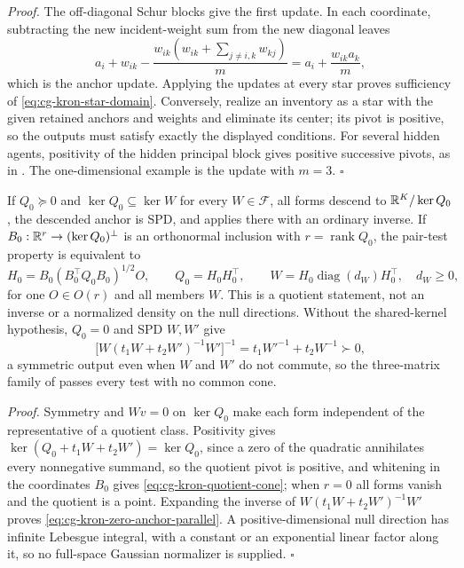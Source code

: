 \noindent\emph{Proof.}
The off-diagonal Schur blocks give the first update. In each coordinate,
subtracting the new incident-weight sum from the new diagonal leaves
\begin{equation}
a_i+w_{ik}
-\frac{w_{ik}(w_{ik}+\sum_{j\neq i,k}w_{kj})}{m}
=a_i+\frac{w_{ik}a_k}{m},
\label{eq:cg-kron-scalar-anchor-remainder}
\end{equation}
which is the anchor update. Applying the updates at every star proves
sufficiency of \eqref{eq:cg-kron-star-domain}. Conversely, realize an inventory
as a star with the given retained anchors and weights and eliminate its center;
its pivot is positive, so the outputs must satisfy exactly the displayed
conditions. For several hidden agents, positivity of the hidden principal block
gives positive successive pivots, as in .
The one-dimensional example is the update with \(m=3\). \(\square\)

If \(Q_0\succeq0\) and \(\ker Q_0\subseteq\ker W\) for every
\(W\in\mathscr F\), all forms descend to \(\mathbb R^K/\ker Q_0\), the descended anchor
is SPD, and  applies there with an
ordinary inverse. If \(B_0:\mathbb R^{r}\to(\ker Q_0)^\perp\) is an orthonormal
inclusion with \(r=\operatorname{rank}Q_0\), the pair-test property is
equivalent to
\begin{equation}
H_0=B_0(B_0^\top Q_0B_0)^{1/2}O,\qquad
Q_0=H_0H_0^\top,\qquad
W=H_0\operatorname{diag}(d_W)H_0^\top,\quad d_W\geq0,
\label{eq:cg-kron-quotient-cone}
\end{equation}
for one \(O\in O(r)\) and all members \(W\). This is a quotient statement, not
an inverse or a normalized density on the null directions. Without the
shared-kernel hypothesis, \(Q_0=0\) and SPD \(W,W'\) give
\begin{equation}
\bigl[W(t_1W+t_2W')^{-1}W'\bigr]^{-1}=t_1W'^{-1}+t_2W^{-1}\succ0,
\label{eq:cg-kron-zero-anchor-parallel}
\end{equation}
a symmetric output even when \(W\) and \(W'\) do not commute, so the
three-matrix family of  passes
every test with no common cone. 

\noindent\emph{Proof.}
Symmetry and \(Wv=0\) on \(\ker Q_0\) make each form independent of the
representative of a quotient class. Positivity gives
\(\ker(Q_0+t_1W+t_2W')=\ker Q_0\), since a zero of the quadratic annihilates
every nonnegative summand, so the quotient pivot is positive, and whitening in
the coordinates \(B_0\) gives \eqref{eq:cg-kron-quotient-cone}; when \(r=0\) all
forms vanish and the quotient is a point. Expanding the inverse of
\(W(t_1W+t_2W')^{-1}W'\) proves \eqref{eq:cg-kron-zero-anchor-parallel}. A
positive-dimensional null direction has infinite Lebesgue integral, with a
constant or an exponential linear factor along it, so no full-space Gaussian
normalizer is supplied. \(\square\)

